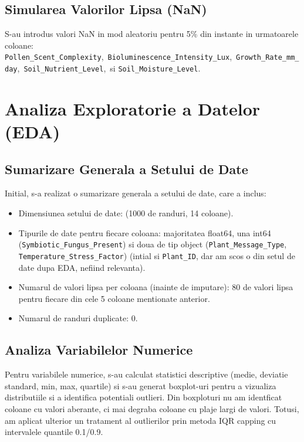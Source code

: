\documentclass[11pt, a4paper]{article}
\begin{document}
\subsection{Simularea Valorilor Lipsa (NaN)}
\sloppy
S-au introdus valori NaN in mod aleatoriu pentru 5\% din instante in urmatoarele coloane: \texttt{Pollen\_Scent\_Complexity},\ \texttt{Bioluminescence\_Intensity\_Lux},\ \texttt{Growth\_Rate\_mm\_day},\ \texttt{Soil\_Nutrient\_Level},\ si \texttt{Soil\_Moisture\_Level}.

\section{Analiza Exploratorie a Datelor (EDA)}

\subsection{Sumarizare Generala a Setului de Date}
Initial, s-a realizat o sumarizare generala a setului de date, care a inclus:
\begin{itemize}[noitemsep, topsep=1pt]
    \item Dimensiunea setului de date: (1000 de randuri, 14 coloane).
    \item Tipurile de date pentru fiecare coloana: majoritatea float64, una int64 (\texttt{Symbiotic\_Fungus\_Present}) si doua de tip object (\texttt{Plant\_Message\_Type}, \texttt{Temperature\_Stress\_Factor}) (intial si \texttt{Plant\_ID}, dar am scos o din setul de date dupa EDA, nefiind relevanta).
    \item Numarul de valori lipsa per coloana (inainte de imputare): 80 de valori lipsa pentru fiecare din cele 5 coloane mentionate anterior.
    \item Numarul de randuri duplicate: 0.
\end{itemize}

\subsection{Analiza Variabilelor Numerice}
Pentru variabilele numerice, s-au calculat statistici descriptive (medie, deviatie standard, min, max, quartile) si s-au generat boxplot-uri pentru a vizualiza distributiile si a identifica potentiali outlieri. Din boxploturi nu am identficat coloane cu valori aberante, ci mai degraba coloane cu plaje largi de valori. Totusi, am aplicat ulterior un tratament al outlierilor prin metoda IQR capping cu intervalele quantile 0.1/0.9.
\end{document}
